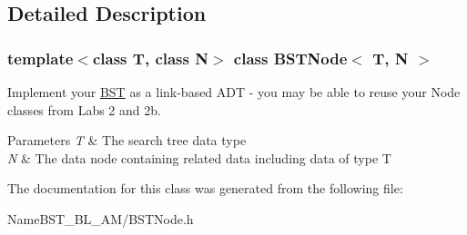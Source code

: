 \subsection{Detailed Description}
\subsubsection*{template$<$class T, class N$>$\newline
class B\+S\+T\+Node$<$ T, N $>$}

Implement your \hyperlink{class_b_s_t}{B\+ST} as a link-\/based A\+DT -\/ you may be able to reuse your Node classes from Labs 2 and 2b. 
\begin{DoxyParams}{Parameters}
{\em T} & The search tree data type \\
\hline
{\em N} & The data node containing related data including data of type T \\
\hline
\end{DoxyParams}


The documentation for this class was generated from the following file\+:\begin{DoxyCompactItemize}
\item 
Name\+B\+S\+T\+\_\+\+B\+L\+\_\+\+A\+M/B\+S\+T\+Node.\+h\end{DoxyCompactItemize}
